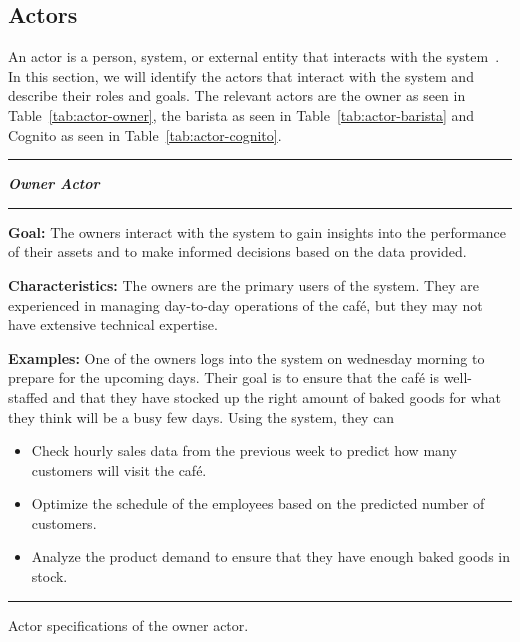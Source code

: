 \subsection{Actors}\label{subsec:actors}

An actor is a person, system, or external entity that interacts with the system~\cite{mathiassen2018}.
In this section, we will identify the actors that interact with the system and describe their roles and goals.
The relevant actors are the owner as seen in Table~\ref{tab:actor-owner}, the barista as seen in
Table~\ref{tab:actor-barista} and Cognito as seen in Table~\ref{tab:actor-cognito}.

\begin{table}[H]
    \noindent
    \rule{\textwidth}{0.4pt}

    \begin{center}
    \noindent
    \textit{\textbf{Owner Actor}}
    \end{center}

    \noindent
    \rule{\textwidth}{0.4pt}
    \noindent

    \textbf{Goal:} The owners interact with the system to gain insights into the performance of their assets
    and to make informed decisions based on the data provided.
    \newline
    \noindent

    \textbf{Characteristics:} The owners are the primary users of the system.
    They are experienced in managing day-to-day operations of the café, but they may not have extensive technical
    expertise.
    \newline
    \noindent

    \textbf{Examples:} One of the owners logs into the system on wednesday morning to prepare for the upcoming days.
    Their goal is to ensure that the café is well-staffed and that they have stocked up the right amount of baked goods
    for what they think will be a busy few days.
    Using the system, they can

    \begin{itemize}
        \item Check hourly sales data from the previous week to predict how many customers will
        visit the café.
        \item Optimize the schedule of the employees based on the predicted number of customers.
        \item Analyze the product demand to ensure that they have enough baked goods in stock.
    \end{itemize}

    \noindent
    \rule{\textwidth}{0.4pt}
    \caption{Actor specifications of the owner actor.
    }\label{tab:actor-owner}
\end{table}

